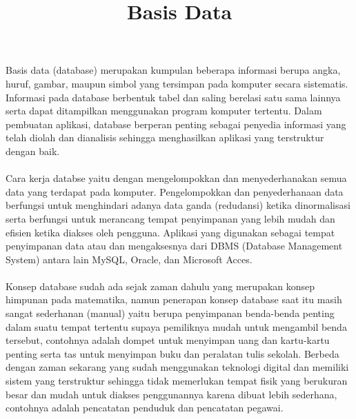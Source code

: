 \documentclass[a4paper,12 pt]{article}
\begin{document}
	\begin{flushleft}
		\title{\textbf{Basis Data}\linebreak}

	\paragraph {}Basis data (database) merupakan kumpulan beberapa informasi berupa angka, huruf, gambar, maupun simbol yang tersimpan pada komputer secara sistematis. 
	Informasi pada database berbentuk tabel dan saling berelasi satu sama lainnya serta dapat 
	ditampilkan menggunakan program komputer tertentu. Dalam pembuatan aplikasi, database berperan penting sebagai penyedia 
	informasi yang telah diolah dan dianalisis sehingga menghasilkan aplikasi yang terstruktur dengan baik.

\paragraph{} Cara kerja databse yaitu dengan mengelompokkan dan menyederhanakan semua data yang terdapat pada komputer.
Pengelompokkan dan penyederhanaan data berfungsi untuk menghindari adanya data ganda (redudansi) ketika dinormalisasi 
serta berfungsi untuk merancang tempat penyimpanan yang lebih mudah dan efisien ketika diakses oleh pengguna. 
Aplikasi yang digunakan sebagai tempat penyimpanan data atau dan mengaksesnya dari DBMS (Database Management System) antara lain MySQL, Oracle, dan Microsoft Acces.

\paragraph{}Konsep database sudah ada sejak zaman dahulu yang merupakan konsep himpunan pada matematika, namun penerapan konsep database 
saat itu masih sangat sederhanan (manual) yaitu berupa penyimpanan benda-benda penting dalam suatu tempat tertentu 
supaya pemiliknya mudah untuk mengambil benda tersebut, contohnya adalah dompet untuk menyimpan uang dan kartu-kartu penting serta 
tas untuk menyimpan buku dan peralatan tulis sekolah. Berbeda dengan zaman sekarang yang sudah menggunakan teknologi digital 
dan memiliki sistem yang terstruktur sehingga tidak memerlukan tempat fisik yang berukuran besar dan mudah untuk diakses 
penggunannya karena dibuat lebih sederhana, contohnya adalah pencatatan penduduk dan pencatatan pegawai.


\end{flushleft}
\end{document}
